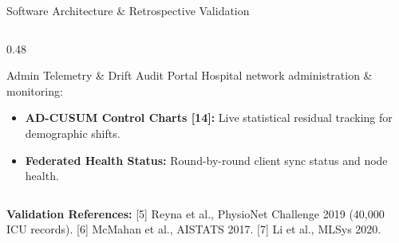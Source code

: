 \documentclass[aspectratio=169, 11pt]{beamer}
\begin{document}
\begin{frame}{Software Architecture \& Retrospective Validation}
\begin{columns}[t]
\begin{column}{0.48\textwidth}
            \begin{block}{\textcolor{neonRose}{Admin Telemetry \& Drift Audit Portal}}
                \tiny
                Hospital network administration \& monitoring:
                \begin{itemize}
                    \item \textbf{AD-CUSUM Control Charts [14]:} Live statistical residual tracking for demographic shifts.
                    \item \textbf{Federated Health Status:} Round-by-round client sync status and node health.
                \end{itemize}
            \end{block}
        \end{column}
    \end{columns}

    \vspace{0.02cm}
    \begin{block}{}
        \tiny \textcolor{neonCyan}{\textbf{Validation References:}} \textcolor{mutedText}{[5] Reyna et al., PhysioNet Challenge 2019 (40,000 ICU records). [6] McMahan et al., AISTATS 2017. [7] Li et al., MLSys 2020.}
    \end{block}
\end{frame}
\end{document}
